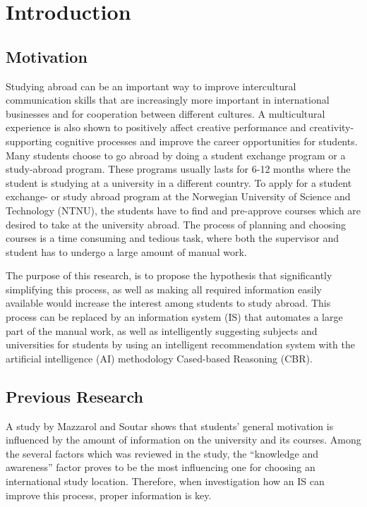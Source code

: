
\chapter{Introduction}

\section{Motivation}

Studying abroad can be an important way to improve intercultural communication skills that are increasingly more important in international businesses and for cooperation between different cultures.\cite{williams2005exploring} A multicultural experience is also shown to positively affect creative performance and creativity-supporting
cognitive processes\cite{leung2008multicultural} and improve the career opportunities for students\cite{brandenburg2014erasmus}. Many students choose to go abroad by doing a student exchange program or a study-abroad program. These programs usually lasts for 6-12 months where the student is studying at a university in a different country. To apply for a student exchange- or study abroad program at the Norwegian University of Science and Technology (NTNU), the students have to find and pre-approve courses which are desired to take at the university abroad. The process of planning and choosing courses is a time consuming and tedious task, where both the supervisor and student has to undergo a large amount of manual work.

The purpose of this research, is to propose the hypothesis that significantly simplifying this process, as well as making all required information easily available would increase the interest among students to study abroad. This process can be replaced by an information system (IS) that automates a large part of the manual work, as well as intelligently suggesting subjects and universities for students by using an intelligent recommendation system with the artificial intelligence (AI) methodology Cased-based Reasoning (CBR). 


\section{Previous Research}

A study by Mazzarol and Soutar\cite{mazzarol2002push} shows that students' general motivation is influenced by the amount of information on the university and its courses. Among the several factors which was reviewed in the study, the \enquote{knowledge and awareness} factor proves to be the most influencing one for choosing an international study location. Therefore, when investigation how an IS can improve this process, proper information is key. 

